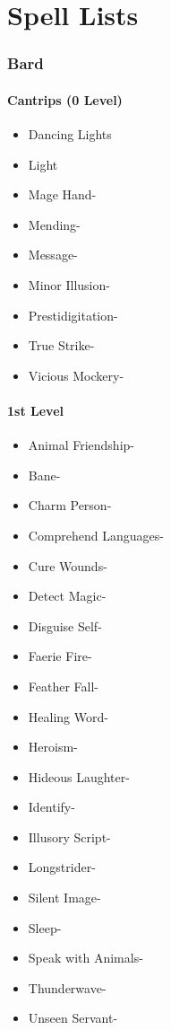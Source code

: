 \documentclass[
]{article}
\date{}
\providecommand{\tightlist}{%
  \setlength{\itemsep}{0pt}\setlength{\parskip}{0pt}}
\begin{document}
\hypertarget{spell-lists}{%
\section{Spell Lists}\label{spell-lists}}

\hypertarget{bard}{%
\subsubsection{Bard}\label{bard}}

\hypertarget{cantrips-0-level}{%
\paragraph{Cantrips (0 Level)}\label{cantrips-0-level}}

\begin{itemize}
\tightlist
\item
  Dancing Lights
\item
  Light
\item
  Mage Hand-
\item
  Mending-
\item
  Message-
\item
  Minor Illusion-
\item
  Prestidigitation-
\item
  True Strike-
\item
  Vicious Mockery-
\end{itemize}

\hypertarget{1st-level}{%
\paragraph{1st Level}\label{1st-level}}

\begin{itemize}
\tightlist
\item
  Animal Friendship-
\item
  Bane-
\item
  Charm Person-
\item
  Comprehend Languages-
\item
  Cure Wounds-
\item
  Detect Magic-
\item
  Disguise Self-
\item
  Faerie Fire-
\item
  Feather Fall-
\item
  Healing Word-
\item
  Heroism-
\item
  Hideous Laughter-
\item
  Identify-
\item
  Illusory Script-
\item
  Longstrider-
\item
  Silent Image-
\item
  Sleep-
\item
  Speak with Animals-
\item
  Thunderwave-
\item
  Unseen Servant-
\end{itemize}
\end{document}
